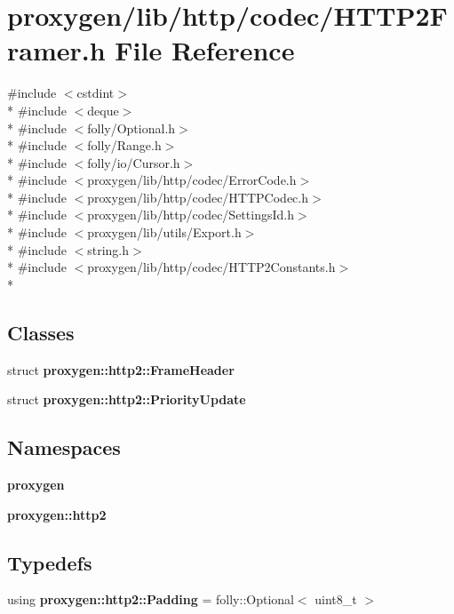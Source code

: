 \section{proxygen/lib/http/codec/\+H\+T\+T\+P2\+Framer.h File Reference}
\label{HTTP2Framer_8h}
{\ttfamily \#include $<$cstdint$>$}\\*
{\ttfamily \#include $<$deque$>$}\\*
{\ttfamily \#include $<$folly/\+Optional.\+h$>$}\\*
{\ttfamily \#include $<$folly/\+Range.\+h$>$}\\*
{\ttfamily \#include $<$folly/io/\+Cursor.\+h$>$}\\*
{\ttfamily \#include $<$proxygen/lib/http/codec/\+Error\+Code.\+h$>$}\\*
{\ttfamily \#include $<$proxygen/lib/http/codec/\+H\+T\+T\+P\+Codec.\+h$>$}\\*
{\ttfamily \#include $<$proxygen/lib/http/codec/\+Settings\+Id.\+h$>$}\\*
{\ttfamily \#include $<$proxygen/lib/utils/\+Export.\+h$>$}\\*
{\ttfamily \#include $<$string.\+h$>$}\\*
{\ttfamily \#include $<$proxygen/lib/http/codec/\+H\+T\+T\+P2\+Constants.\+h$>$}\\*
\subsection*{Classes}
\begin{DoxyCompactItemize}
\item 
struct {\bf proxygen\+::http2\+::\+Frame\+Header}
\item 
struct {\bf proxygen\+::http2\+::\+Priority\+Update}
\end{DoxyCompactItemize}
\subsection*{Namespaces}
\begin{DoxyCompactItemize}
\item 
 {\bf proxygen}
\item 
 {\bf proxygen\+::http2}
\end{DoxyCompactItemize}
\subsection*{Typedefs}
\begin{DoxyCompactItemize}
\item 
using {\bf proxygen\+::http2\+::\+Padding} = folly\+::\+Optional$<$ uint8\+\_\+t $>$
\end{DoxyCompactItemize}
